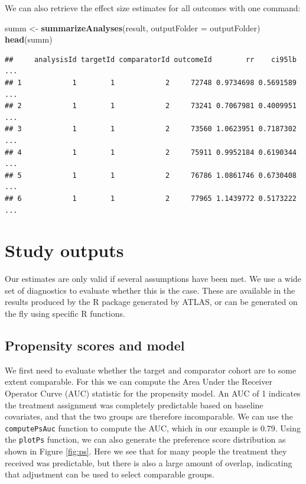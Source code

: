 \documentclass[]{book}
\newenvironment{Shaded}{\begin{snugshade}}{\end{snugshade}}
\newcommand{\DataTypeTok}[1]{\textcolor[rgb]{0.13,0.29,0.53}{#1}}
\newcommand{\KeywordTok}[1]{\textcolor[rgb]{0.13,0.29,0.53}{\textbf{#1}}}
\newcommand{\NormalTok}[1]{#1}
\newcommand{\StringTok}[1]{\textcolor[rgb]{0.31,0.60,0.02}{#1}}
\begin{document}
We can also retrieve the effect size estimates for all outcomes with one command:

\begin{Shaded}
\begin{Highlighting}[]
\NormalTok{summ <-}\StringTok{ }\KeywordTok{summarizeAnalyses}\NormalTok{(result, }\DataTypeTok{outputFolder =}\NormalTok{ outputFolder)}
\KeywordTok{head}\NormalTok{(summ)}
\end{Highlighting}
\end{Shaded}

\begin{verbatim}
##     analysisId targetId comparatorId outcomeId        rr    ci95lb  ...
## 1            1        1            2     72748 0.9734698 0.5691589  ...
## 2            1        1            2     73241 0.7067981 0.4009951  ...
## 3            1        1            2     73560 1.0623951 0.7187302  ...
## 4            1        1            2     75911 0.9952184 0.6190344  ...
## 5            1        1            2     76786 1.0861746 0.6730408  ...
## 6            1        1            2     77965 1.1439772 0.5173222  ...
\end{verbatim}

\hypertarget{studyOutputs}{%
\section{Study outputs}\label{studyOutputs}}

Our estimates are only valid if several assumptions have been met. We use a wide set of diagnostics to evaluate whether this is the case. These are available in the results produced by the R package generated by ATLAS, or can be generated on the fly using specific R functions.

\hypertarget{propensity-scores-and-model}{%
\subsection{Propensity scores and model}\label{propensity-scores-and-model}}

We first need to evaluate whether the target and comparator cohort are to some extent comparable. For this we can compute the Area Under the Receiver Operator Curve (AUC) statistic for the propensity model. An AUC of 1 indicates the treatment assignment was completely predictable based on baseline covariates, and that the two groups are therefore incomparable. We can use the \texttt{computePsAuc} function to compute the AUC, which in our example is 0.79. Using the \texttt{plotPs} function, we can also generate the preference score distribution as shown in Figure \ref{fig:ps}. Here we see that for many people the treatment they received was predictable, but there is also a large amount of overlap, indicating that adjustment can be used to select comparable groups. 
\end{document}
